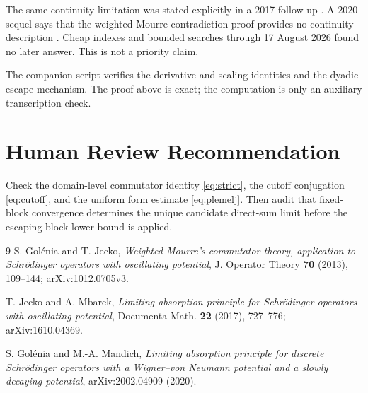 \documentclass[11pt]{article}
\begin{document}
The same continuity limitation was stated explicitly in a 2017 follow-up
\cite{JM}.  A 2020 sequel says that the weighted-Mourre contradiction proof
provides no continuity description \cite{GM}.  Cheap indexes and bounded
searches through 17 August 2026 found no later answer.  This is not a
priority claim.

The companion script verifies the derivative and scaling identities and
the dyadic escape mechanism.  The proof above is exact; the computation is
only an auxiliary transcription check.

\section*{Human Review Recommendation}

Check the domain-level commutator identity \eqref{eq:strict}, the cutoff
conjugation \eqref{eq:cutoff}, and the uniform form estimate
\eqref{eq:plemelj}.  Then audit that fixed-block convergence determines the
unique candidate direct-sum limit before the escaping-block lower bound is
applied.

\begin{thebibliography}{9}
\small
{}
S. Gol\'enia and T. Jecko,
\emph{Weighted Mourre's commutator theory, application to Schr\"odinger
operators with oscillating potential}, J. Operator Theory \textbf{70}
(2013), 109--144; arXiv:1012.0705v3.

T. Jecko and A. Mbarek,
\emph{Limiting absorption principle for Schr\"odinger operators with
oscillating potential}, Documenta Math. \textbf{22} (2017), 727--776;
arXiv:1610.04369.

S. Gol\'enia and M.-A. Mandich,
\emph{Limiting absorption principle for discrete Schr\"odinger operators
with a Wigner--von Neumann potential and a slowly decaying potential},
arXiv:2002.04909 (2020).
\end{thebibliography}
\end{document}
